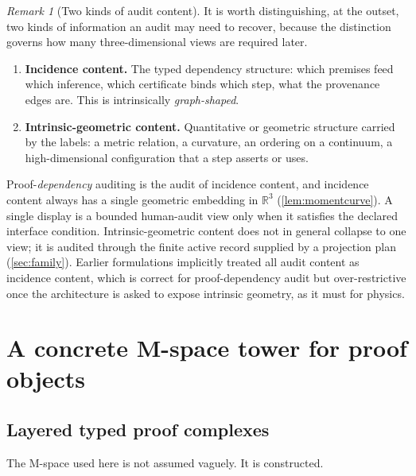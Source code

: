 \documentclass[11pt]{article}
\newcommand{\R}{\mathbb R}
\theoremstyle{plain}
\theoremstyle{definition}
\theoremstyle{remark}
\newtheorem{remark}[theorem]{Remark}
\begin{document}
\begin{remark}[Two kinds of audit content]
\label{rem:two-contents}
It is worth distinguishing, at the outset, two kinds of information an audit may need to recover, because the distinction governs how many three-dimensional views are required later.
\begin{enumerate}
    \item \textbf{Incidence content.}  The typed dependency structure: which premises feed which inference, which certificate binds which step, what the provenance edges are.  This is intrinsically \emph{graph-shaped}.
    \item \textbf{Intrinsic-geometric content.}  Quantitative or geometric structure carried by the labels: a metric relation, a curvature, an ordering on a continuum, a high-dimensional configuration that a step asserts or uses.
\end{enumerate}
Proof-\emph{dependency} auditing is the audit of incidence content, and incidence content always has a single geometric embedding in $\R^3$ (\cref{lem:momentcurve}).  A single display is a bounded human-audit view only when it satisfies the declared interface condition.  Intrinsic-geometric content does not in general collapse to one view; it is audited through the finite active record supplied by a projection plan (\cref{sec:family}).  Earlier formulations implicitly treated all audit content as incidence content, which is correct for proof-dependency audit but over-restrictive once the architecture is asked to expose intrinsic geometry, as it must for physics.
\end{remark}

\section{A concrete M-space tower for proof objects}
\label{sec:mtower}

\subsection{Layered typed proof complexes}

The M-space used here is not assumed vaguely.  It is constructed.
\end{document}
